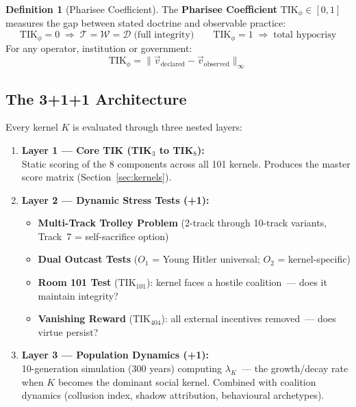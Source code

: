 \documentclass[11pt,a4paper]{article}
\theoremstyle{definition}
\newtheorem{definition}[theorem]{Definition}
\theoremstyle{remark}
\newcommand{\TIKhundredone}{\text{TIK}_{101}}   %
\newcommand{\TIKfourohfour}{\text{TIK}_{404}}   %
\newcommand{\TIKpharisee}{\text{TIK}_{\phi}}    %
\newcommand{\Thought}{\mathcal{T}}
\newcommand{\Word}{\mathcal{W}}
\newcommand{\Deed}{\mathcal{D}}
\newcommand{\IntegrityAxiom}{\Thought = \Word = \Deed}
\begin{document}
\begin{definition}[Pharisee Coefficient]
\label{def:pharisee}
The \textbf{Pharisee Coefficient} $\TIKpharisee \in [0,1]$ measures
the gap between stated doctrine and observable practice:
\[
  \TIKpharisee = 0 \;\Rightarrow\; \IntegrityAxiom \;\text{(full integrity)}
  \qquad
  \TIKpharisee = 1 \;\Rightarrow\; \text{total hypocrisy}
\]
For any operator, institution or government:
\[
  \TIKpharisee
  = \bigl\lVert \vec{v}_{\text{declared}} - \vec{v}_{\text{observed}}
    \bigr\rVert_\infty
\]
\end{definition}

\subsection{The 3+1+1 Architecture}
\label{sec:tik-architecture}

\begin{scibox}
Every kernel $K$ is evaluated through three nested layers:

\begin{enumerate}[leftmargin=1.5cm, itemsep=8pt]
  \item \textbf{Layer 1 --- Core TIK (TIK$_3$ to TIK$_8$):}\\
    Static scoring of the 8 components
    across all 101 kernels. Produces the master score matrix
    (Section~\ref{sec:kernels}).

  \item \textbf{Layer 2 --- Dynamic Stress Tests (+1):}\\
    \begin{itemize}[noitemsep]
      \item \textbf{Multi-Track Trolley Problem}
        (2-track through 10-track variants, Track~7 = self-sacrifice option)
      \item \textbf{Dual Outcast Tests}
        ($O_1$ = Young Hitler universal; $O_2$ = kernel-specific)
      \item \textbf{Room 101 Test} ($\TIKhundredone$):
        kernel faces a hostile coalition~--- does it maintain integrity?
      \item \textbf{Vanishing Reward} ($\TIKfourohfour$):
        all external incentives removed~--- does virtue persist?
    \end{itemize}

  \item \textbf{Layer 3 --- Population Dynamics (+1):}\\
    10-generation simulation (300 years) computing $\lambda_K$~---
    the growth/decay rate when $K$ becomes the dominant social kernel.
    Combined with coalition dynamics (collusion index,
    shadow attribution, behavioural archetypes).
\end{enumerate}
\end{scibox}
\end{document}
